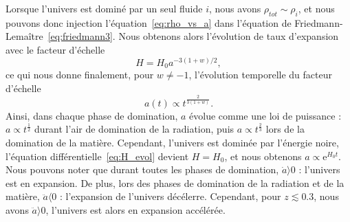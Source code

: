 \documentclass[11pt, twoside, a4paper, openright]{report}
\begin{document}
Lorsque l'univers est dominé par un seul fluide $i$, nous avons $\rho_{tot} \sim \rho_{i}$, et nous pouvons donc injection l'équation~\ref{eq:rho_vs_a} dans l'équation de Friedmann-Lemaître~\ref{eq:friedmann3}. Nous obtenons alors l'évolution de taux d'expansion avec le facteur d'échelle
\begin{equation}
  \label{eq:H_evol}
  H = H_0 a^{-3 (1+w) / 2} ,
\end{equation}
ce qui nous donne finalement, pour $w \neq -1$, l'évolution temporelle du facteur d'échelle
\begin{equation}
  \label{eq:a_vs_t}
  a(t) \propto t^{\frac{2}{3(1+w)}} .
\end{equation}
Ainsi, dans chaque phase de domination, $a$ évolue comme une loi de puissance : $a \propto t^{\frac{1}{2}}$ durant l'air de domination de la radiation, puis $a \propto t^{\frac{2}{3}}$ lors de la domination de la matière. Cependant, l'univers est dominée par l'énergie noire, l'équation différentielle~\ref{eq:H_evol} devient $H = H_0$, et nous obtenons $a \propto \mathrm{e}^{H_{0} t}$. Nous pouvons noter que durant toutes les phases de domination, $\dot a \rangle 0$ : l'univers est en expansion. De plus, lors des phases de domination de la radiation et de la matière, $\ddot a \langle 0$ : l'expansion de l'univers décélerre. Cependant, pour $ z \lesssim 0.3$, nous avons $\ddot a \rangle 0$, l'univers est alors en expansion accélérée.


\end{document}

